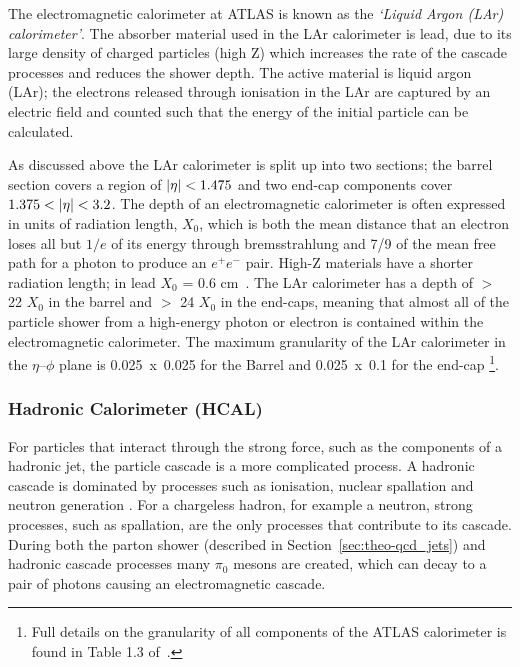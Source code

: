The electromagnetic calorimeter at ATLAS is known as the \textit{`Liquid Argon (LAr) calorimeter'}.
The absorber material used in the LAr calorimeter is lead, due to its large density of charged particles (high Z)
which increases the rate of the cascade processes and reduces the shower depth.
The active material is liquid argon (LAr);
the electrons released through ionisation in the LAr are captured by an electric field and counted
such that the energy of the initial particle can be calculated.

As discussed above the LAr calorimeter is split up into two sections;
the barrel section covers a region of $|\eta|\nobreak<\nobreak1.475$ and two end-cap components cover $1.375\nobreak<\nobreak|\eta|\nobreak<\nobreak3.2$.
The depth of an electromagnetic calorimeter is often expressed in units of radiation length, $X_{0}$,
which is both the mean distance that an electron loses all but  $1/e$ of its energy through bremsstrahlung
and 7/9 of the mean free path for a photon to produce an $e^+e^-$ pair.
High-Z materials have a shorter radiation length; in lead $X_0$ = 0.6 cm~\cite{obj-bjets_PDG}.
The LAr calorimeter has a depth of $>$ 22 $X_{0}$ in the barrel and $>$ 24 $X_{0}$ in the end-caps,
meaning that almost all of the particle shower from a high-energy photon
or electron is contained within the electromagnetic calorimeter.
The maximum granularity of the LAr calorimeter in the $\eta$--$\phi$ plane
is \mbox{0.025~x~0.025} for the Barrel and 0.025~x~0.1 for the end-cap
\footnote{Full details on the granularity of all components of the ATLAS calorimeter is found in Table 1.3 of~\cite{det-ATLAS_Exp}.}. 

\subsubsection{Hadronic Calorimeter (HCAL)}
\label{sec:det-calo_HCAL}

For particles that interact through the strong force, such as the components of a hadronic jet,
the particle cascade is a more complicated process.
A hadronic cascade is dominated by processes such as
ionisation, nuclear spallation and neutron generation \cite{det-thesis_kate,det-nuclearInt_book}.
For a chargeless hadron, for example a neutron,
strong processes, such as spallation, are the only processes that contribute to its cascade.
During both the parton shower (described in Section~\ref{sec:theo-qcd_jets}) and hadronic cascade processes many $\pi_0$ mesons are created,
which can decay to a pair of photons causing an electromagnetic cascade. 


